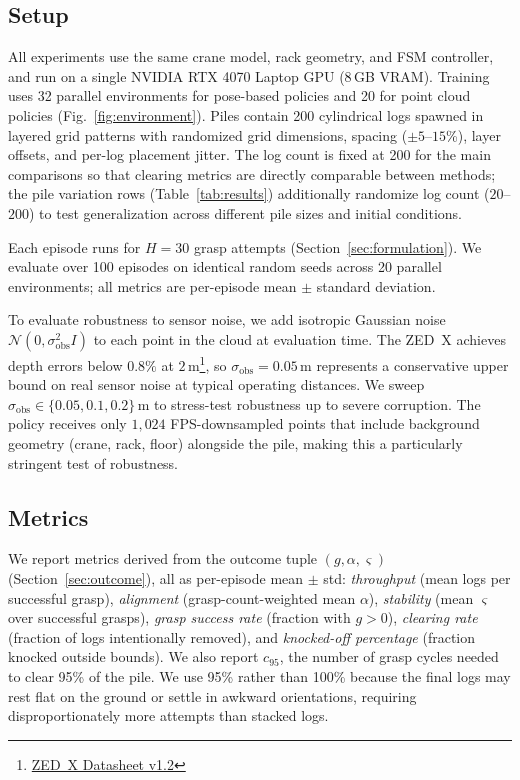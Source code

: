 \documentclass[letterpaper, 10 pt, conference]{ieeeconf}
\begin{document}
\subsection{Setup}
All experiments use the same crane model, rack geometry, and FSM controller, and run on a single NVIDIA RTX 4070 Laptop GPU (8\,GB VRAM).
Training uses 32 parallel environments for pose-based policies and 20 for point cloud policies (Fig.~\ref{fig:environment}).
Piles contain 200 cylindrical logs spawned in layered grid patterns with randomized grid dimensions, spacing ($\pm 5$--$15$\%), layer offsets, and per-log placement jitter.
The log count is fixed at 200 for the main comparisons so that clearing metrics are directly comparable between methods; the pile variation rows (Table~\ref{tab:results}) additionally randomize log count ($20$--$200$) to test generalization across different pile sizes and initial conditions.

Each episode runs for $H=30$ grasp attempts (Section~\ref{sec:formulation}). We evaluate over 100 episodes on identical random seeds across 20 parallel environments; all metrics are per-episode mean $\pm$ standard deviation.

To evaluate robustness to sensor noise, we add isotropic Gaussian noise $\mathcal{N}(0, \sigma_{\mathrm{obs}}^2 I)$ to each point in the cloud at evaluation time.
The ZED~X achieves depth errors below $0.8\%$ at $2$\,m\footnote{\href{https://cdn.sanity.io/files/s18ewfw4/staging/ec78a504b36ab95d6620ac720ffa5feaa2e8948b.pdf/ZED\%20X\%20Datasheet\%20v1.2.pdf}{ZED~X Datasheet v1.2}}, so $\sigma_{\mathrm{obs}} = 0.05$\,m represents a conservative upper bound on real sensor noise at typical operating distances.
We sweep $\sigma_{\mathrm{obs}} \in \{0.05, 0.1, 0.2\}$\,m to stress-test robustness up to severe corruption.
The policy receives only $1{,}024$ FPS-downsampled points that include background geometry (crane, rack, floor) alongside the pile, making this a particularly stringent test of robustness.


\subsection{Metrics}
\label{sec:metrics}
We report metrics derived from the outcome tuple $(g, \alpha, \varsigma)$ (Section~\ref{sec:outcome}), all as per-episode mean $\pm$ std: \emph{throughput} (mean logs per successful grasp), \emph{alignment} (grasp-count-weighted mean $\alpha$), \emph{stability} (mean $\varsigma$ over successful grasps), \emph{grasp success rate} (fraction with $g>0$), \emph{clearing rate} (fraction of logs intentionally removed), and \emph{knocked-off percentage} (fraction knocked outside bounds). We also report $c_{95}$, the number of grasp cycles needed to clear 95\% of the pile. We use 95\% rather than 100\% because the final logs may rest flat on the ground or settle in awkward orientations, requiring disproportionately more attempts than stacked logs.
\end{document}
